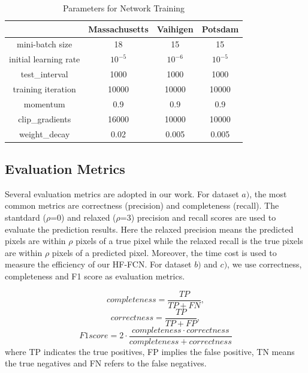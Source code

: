 \begin{table}
\vspace{-0.2cm}
\setlength{\belowcaptionskip}{-2cm} 
\centering
\caption {Parameters for Network Training}
\label{table:Train-Parameter}
\begin{tabular}{c|c|c|c}
\hline
&Massachusetts &Vaihigen &Potsdam\\  \hline
mini-batch size & 18& 15 & 15 \\
initial learning rate & $10^{-5}$ & $10^{-6}$ & $10^{-5}$\\
test\_interval&1000 & 1000 &1000\\
training iteration & 10000 & 10000& 10000\\
momentum & 0.9 & 0.9 & 0.9\\
clip\_gradients & 16000& 10000 & 10000\\
weight\_decay & 0.02& 0.005 & 0.005\\ \hline
\end{tabular}
\end{table}

\subsection{Evaluation Metrics}
Several evaluation metrics are adopted in our work. For dataset ${a)}$, the most common metrics are correctness (precision) and completeness (recall).
The stantdard ($\rho$=0) and relaxed ($\rho$=3) precision and recall scores are used to evaluate the prediction results. Here the relaxed precision means the predicted pixels are within $\rho$ pixels of a true pixel while the relaxed recall is the true pixels are within $\rho$ pixels of a predicted pixel. Moreover, the time cost is used to measure the efficiency of our HF-FCN. For dataset ${b)}$ and ${c)}$, we use correctness, completeness and F1 score as evaluation metrics.


\begin{equation}
 {completeness} = \frac{TP}{TP+FN},
\end{equation}
\begin{equation}
{correctness} = \frac{TP}{TP+FP},
\end{equation}
\begin{equation}
{F1 score}= 2\cdot\frac{completeness\cdot correctness}{completeness+correctness}
\end{equation}
%
where TP indicates the true positives, FP implies the false positive, TN means the true negatives and FN refers to the false negatives.
